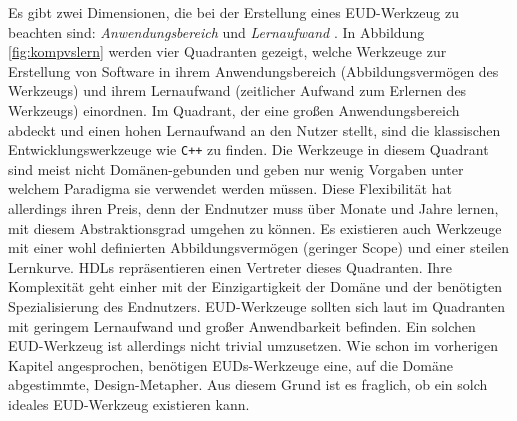 Es gibt zwei Dimensionen, die bei der Erstellung eines \ac{EUD}-Werkzeug zu beachten sind: \textit{Anwendungsbereich} und \textit{Lernaufwand} \cite{fischer2004meta}. In Abbildung \ref{fig:kompvslern} werden vier Quadranten gezeigt, welche Werkzeuge zur Erstellung von Software in ihrem Anwendungsbereich (Abbildungsvermögen des Werkzeugs) und ihrem Lernaufwand (zeitlicher Aufwand zum Erlernen des Werkzeugs) einordnen. Im Quadrant, der eine großen Anwendungsbereich abdeckt und einen hohen Lernaufwand an den Nutzer stellt, sind die klassischen Entwicklungswerkzeuge wie \texttt{C++} zu finden. Die Werkzeuge in diesem Quadrant sind meist nicht Domänen-gebunden und geben nur wenig Vorgaben unter welchem Paradigma sie verwendet werden müssen. Diese Flexibilität hat allerdings ihren Preis, denn der Endnutzer muss über Monate und Jahre lernen, mit diesem Abstraktionsgrad umgehen zu können. Es existieren auch Werkzeuge mit einer wohl definierten Abbildungsvermögen (geringer Scope) und einer steilen Lernkurve. \acp{HDL} repräsentieren einen Vertreter dieses Quadranten. Ihre Komplexität geht einher mit der Einzigartigkeit der Domäne und der benötigten Spezialisierung des Endnutzers. \ac{EUD}-Werkzeuge sollten sich laut \cite{fischer2004meta} im Quadranten mit geringem Lernaufwand und großer Anwendbarkeit befinden. Ein solchen \ac{EUD}-Werkzeug ist allerdings nicht trivial umzusetzen. Wie schon im vorherigen Kapitel angesprochen, benötigen \acp{EUD}-Werkzeuge eine, auf die Domäne abgestimmte, Design-Metapher. Aus diesem Grund ist es fraglich, ob ein solch ideales \ac{EUD}-Werkzeug existieren kann.

